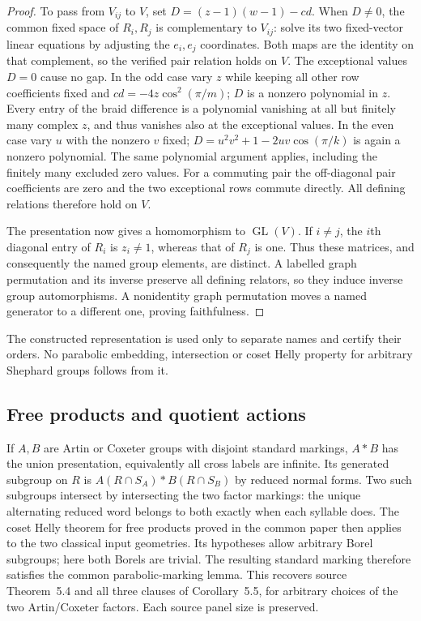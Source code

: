 \begin{proof}
To pass from $V_{ij}$ to $V$, set
$D=(z-1)(w-1)-cd$. When $D\ne0$, the common fixed space of
$R_i,R_j$ is complementary to $V_{ij}$: solve its two fixed-vector
linear equations by adjusting the $e_i,e_j$ coordinates. Both maps
are the identity on that complement, so the verified pair relation
holds on $V$. The exceptional values $D=0$ cause no gap. In the odd
case vary $z$ while keeping all other row coefficients fixed and
$cd=-4z\cos^2(\pi/m)$; $D$ is a nonzero polynomial in $z$.
Every entry of the braid difference is a polynomial vanishing at all
but finitely many complex $z$, and thus vanishes also at the exceptional
values. In the even case vary $u$ with the nonzero $v$ fixed;
$D=u^2v^2+1-2uv\cos(\pi/k)$ is again a nonzero polynomial.
The same polynomial argument applies, including the finitely many
excluded zero values. For a commuting pair the off-diagonal pair
coefficients are zero and the two exceptional rows commute directly.
All defining relations therefore hold on $V$.

The presentation now gives a homomorphism to $\operatorname{GL}(V)$.
If $i\ne j$, the $i$th diagonal entry of $R_i$ is $z_i\ne1$,
whereas that of $R_j$ is one. Thus these matrices, and consequently
the named group elements, are distinct. A labelled graph permutation
and its inverse preserve all defining relators, so they induce inverse
group automorphisms. A nonidentity graph permutation moves a named
generator to a different one, proving faithfulness.
\end{proof}
The constructed representation is used only to separate names and
certify their orders. No parabolic embedding, intersection or coset
Helly property for arbitrary Shephard groups follows from it.


\subsection{Free products and quotient actions}
If $A,B$ are Artin or Coxeter groups with disjoint standard markings,
$A*B$ has the union presentation, equivalently all cross labels are
infinite. Its generated subgroup on $R$ is
$A(R\cap S_A)*B(R\cap S_B)$ by reduced normal forms. Two such
subgroups intersect by intersecting the two factor markings: the
unique alternating reduced word belongs to both exactly when each
syllable does. The coset Helly theorem for free products proved in
the common paper
then applies to the two classical input geometries. Its hypotheses
allow arbitrary Borel subgroups; here both Borels are trivial.
The resulting standard marking therefore satisfies
the common parabolic-marking lemma. This recovers source Theorem~5.4 and all
three clauses of Corollary~5.5, for arbitrary choices of the two
Artin/Coxeter factors. Each source panel size is preserved.


